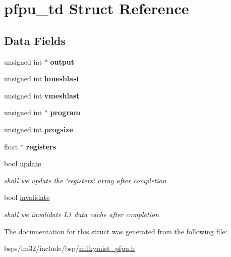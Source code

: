 \hypertarget{structpfpu__td}{}\section{pfpu\+\_\+td Struct Reference}
\label{structpfpu__td}
\subsection*{Data Fields}
\begin{DoxyCompactItemize}
\item 
\mbox{\label{structpfpu__td_aad867b06891123b06f97f4c5b3b7dd52}} 
unsigned int $\ast$ {\bfseries output}
\item 
\mbox{\label{structpfpu__td_a7fb04a7c5481334229504ca212e03611}} 
unsigned int {\bfseries hmeshlast}
\item 
\mbox{\label{structpfpu__td_a8b04cba01489670a9b566cd160533e8e}} 
unsigned int {\bfseries vmeshlast}
\item 
\mbox{\label{structpfpu__td_a8e063e25f23d9a8911b120d5b6bfe57c}} 
unsigned int $\ast$ {\bfseries program}
\item 
\mbox{\label{structpfpu__td_a57889fa2f4eddafdcbba5e8e0ff50f99}} 
unsigned int {\bfseries progsize}
\item 
\mbox{\label{structpfpu__td_aa2ad2e943a38f4734cf3a479b0cefe8c}} 
float $\ast$ {\bfseries registers}
\item 
\mbox{\label{structpfpu__td_a087de1c0a0a1a4f6a7e6c9c536686b69}} 
bool \mbox{\hyperlink{structpfpu__td_a087de1c0a0a1a4f6a7e6c9c536686b69}{update}}
\begin{DoxyCompactList}\small\item\em shall we update the \char`\"{}registers\char`\"{} array after completion \end{DoxyCompactList}\item 
\mbox{\label{structpfpu__td_a2451fd3a0498ad6e5621a25fccc1901d}} 
bool \mbox{\hyperlink{structpfpu__td_a2451fd3a0498ad6e5621a25fccc1901d}{invalidate}}
\begin{DoxyCompactList}\small\item\em shall we invalidate L1 data cache after completion \end{DoxyCompactList}\end{DoxyCompactItemize}


The documentation for this struct was generated from the following file\+:\begin{DoxyCompactItemize}
\item 
bsps/lm32/include/bsp/\mbox{\hyperlink{milkymist__pfpu_8h}{milkymist\+\_\+pfpu.\+h}}\end{DoxyCompactItemize}
